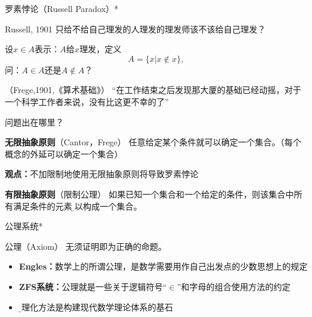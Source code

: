 \begin{frame}{罗素悖论（Russell Paradox）*}
	\linespread{1.2}\pause 
	\begin{block}{Russell, 1901}
		只给不给自己理发的人理发的理发师该不该给自己理发？
	\end{block}\pause 
	设$x\in A$表示：$A$给$x$理发，\pause 定义
	$$A=\{x|x\notin x\},$$\pause 
	问：$A\in A$还是$A\notin A$？\pause 
	\begin{block}{{}（Frege,1901,《算术基础》）}
		“在工作结束之后发现那大厦的基础已经动摇，对于一个科学工作者来说，没有比这更不幸的了”
	\end{block}
\end{frame}


\begin{frame}{问题出在哪里？}
	\linespread{1.2}\pause 
	\begin{block}{{\bf 无限抽象原则}（Cantor，Frege）}\pause 
		任意给定某个条件就可以确定一个集合。\pause （每个概念的外延可以确定一个集合）
	\end{block}\pause 
	{\bf 观点：}不加限制地使用无限抽象原则将导致罗素悖论\pause 
	\begin{block}{{\bf 有限抽象原则}（限制公理）}\pause 
		如果已知一个集合\pause 和一个给定的条件，\pause 则该集合中所有满足条件的元素{\b 可以}构成一个集合。
	\end{block}\pause 
\end{frame}

\begin{frame}{公理系统*}
	\linespread{1.2}\pause 
	\begin{block}{公理（Axiom）}\pause 
		无须证明即为正确的命题。
	\end{block}\pause 
	\begin{itemize}
	  \item {\bf Engles：}数学上的所谓公理，是数学需要用作自己出发点的少数思想上的规定\pause 
	  \item {\bf ZFS系统：}公理就是一些关于逻辑符号\alert{“$\in$”}和\alert{字母}的组合使用方法的约定\pause 
	  \item {\b 公理化方法}是构建现代数学理论体系的基石\pause 
	\end{itemize}
	\vspace{1ex}
	\centerline{\Large{}}
\end{frame}

